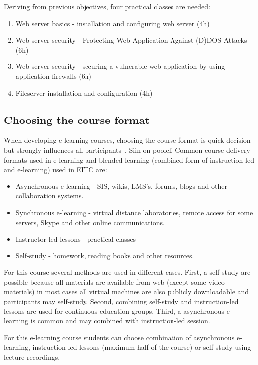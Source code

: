 Deriving from previous objectives, four practical classes are needed:
\begin{enumerate}[label=LAB \arabic*.,leftmargin=*]
   \item Web server basics - installation and configuring web server (4h)
  	\item Web server security - Protecting Web Application Against (D)DOS Attacks (6h)
  	\item Web server security - securing a vulnerable web application by using application firewalls (6h)
  	\item Fileserver installation and configuration (4h)
\end{enumerate}


\subsection{Choosing the course format}

When developing e-learning courses, choosing the course format is quick decision but strongly influences all participants~\citep[p.14]{OppeArenduskeskus2010}. 
{\color{red} Siin on pooleli}
Common course delivery formats used in e-learning and blended learning (combined form of instruction-led and e-learning) used in \gls{EITC} are: 
\begin{itemize}
\item Asynchronous e-learning - \gls{SIS}, wikis, \gls{LMS}'s, forums, blogs and other collaboration systems.
\item Synchronous e-learning - virtual distance laboratories, remote access for some servers, Skype and other online communications.
\item Instructor-led lessons - practical classes
\item Self-study - homework, reading books and other resources.
\end{itemize}

For this course several methods are used in different cases. First, a self-study are possible because all materials are available from web (except some video materials) in most cases all virtual machines are also publicly downloadable and participants may self-study. Second, combining self-study and instruction-led lessons are used for continuous education groups. Third, a asynchronous e-learning is common and may combined with instruction-led session.

For this e-learning course students can choose combination of asynchronous e-learning, instruction-led lessons (maximum half of the course) or self-study using lecture recordings.

